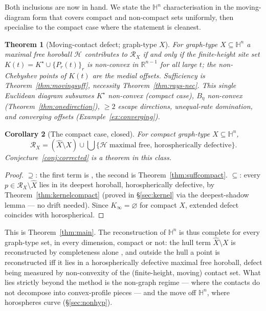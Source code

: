 \documentclass[11pt]{article}
\newtheorem{theorem}{Theorem}[section]
\newtheorem{corollary}[theorem]{Corollary}
\theoremstyle{remark}
\newcommand{\R}{\mathbb{R}}
\newcommand{\X}{X}
\newcommand{\Xhat}{\widehat{\X}}
\newcommand{\Rx}{\mathcal{R}_{\X}}
\newcommand{\Hb}[1]{\mathcal{H}_{#1}}
\begin{document}
Both inclusions are now in hand. We state the
$\mathbb{H}^{n}$ characterisation in the moving-diagram form that covers
compact and non-compact sets uniformly, then specialise to the compact
case where the statement is cleanest.

\begin{theorem}[Moving-contact defect; graph-type $\X$]\label{conj:rays}
For graph-type $\X\subseteq\mathbb{H}^{n}$ a maximal free horoball
$\Hb{}$ contributes to $\Rx$ \emph{if and only if} the finite-height
site set $K(t)=K^{\star}\cup\{P_{r}(t)\}_{r}$ is non-convex in
$\R^{n-1}$ for all large $t$; the non-Chebyshev points of $K(t)$ are the
medial offsets. Sufficiency is Theorem~\ref{thm:movingsuff}, necessity
Theorem~\ref{thm:rays-nec}. This single Euclidean diagram subsumes
$K^{\star}$ non-convex (compact case), $B_{\eta}$ non-convex
(Theorem~\ref{thm:onedirection}), $\ge2$ escape directions, unequal-rate
domination, and converging offsets (Example~\ref{ex:converging}).
\end{theorem}

\begin{corollary}[The compact case, closed]\label{cor:compactclosed}
For compact graph-type $\X\subseteq\mathbb{H}^{n}$,
\[
\Rx=(\Xhat\setminus\X)\cup\bigcup\{\Hb{}\ \text{maximal free,
horospherically defective}\}.
\]
Conjecture~\ref{conj:corrected} is a theorem in this class.
\end{corollary}

\begin{proof}
$\supseteq$: the first term is \cite[Thm.~3.1]{R1}, the second is
Theorem~\ref{thm:suffcompact}. $\subseteq$: every $p\in\Rx\setminus
\Xhat$ lies in its deepest horoball, horospherically defective, by
Theorem~\ref{thm:kernelcompact} (proved in \S\ref{sec:kernel} via the
deepest-shadow lemma --- no drift needed). Since
$K_{\infty}=\varnothing$ for compact $\X$, extended defect coincides
with horospherical.
\end{proof}

This is Theorem~\ref{thm:main}. The reconstruction of
$\mathbb{H}^{n}$ is thus complete for every graph-type set, in every
dimension, compact or not: the hull term $\Xhat\setminus\X$ is reconstructed
by completeness alone \cite[Thm.~3.1]{R1}, and outside the hull a point is
reconstructed iff it lies in a horospherically defective maximal free
horoball, defect being measured by non-convexity of the (finite-height,
moving) contact set. What lies strictly beyond the method is the non-graph
regime --- where the contacts do not decompose into convex-profile pieces
--- and the move off $\mathbb{H}^{n}$, where horospheres curve
(\S\ref{sec:nonhyp}).
\end{document}
